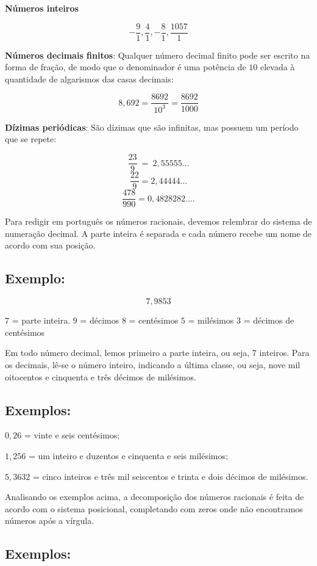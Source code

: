 \textbf{Números inteiros}

 $$-\frac{9}{1},  \frac{4}{1}, -\frac{8}{1},  \frac{1057}{1}$$

\textbf{Números decimais finitos}: Qualquer número decimal finito pode ser
escrito na forma de fração, de modo que o denominador é uma potência de
$10$ elevada à quantidade de algarismos das casas decimais:

$$8,692  = \frac{8692}{10^{3}} = \frac{8692}{1000}$$

\textbf{Dízimas periódicas}: São dízimas que são infinitas, mas possuem um
período que se repete: 

$$\frac{23}{9}\  = \ 2,55555\ldots{}$$
$$\frac{22}{9} = 2,44444\ldots{}$$
$$\frac{478}{990} = 0,4828282\ldots{}.$$

Para redigir em português os números racionais, devemos relembrar do
sistema de numeração decimal. A parte inteira é separada e cada número
recebe um nome de acordo com sua posição.

\subsection{Exemplo:} 


$$7,9853$$

$7$ = parte inteira. $9$ = décimos $8$ = centésimos $5$ = milésimos $3$ = décimos
de centésimos

Em todo número decimal, lemos primeiro a parte inteira, ou seja, 7
inteiros. Para os decimais, lê-se o número inteiro, indicando a última
classe, ou seja, nove mil oitocentos e cinquenta e três décimos de
milésimos.

\subsection{Exemplos:}

$0,26$ = vinte e seis centésimos;

$1,256$ = um inteiro e duzentos e cinquenta e seis milésimos;

$5,3632$ = cinco inteiros e três mil seiscentos e trinta e dois décimos de
milésimos.

Analisando os exemplos acima, a decomposição dos números racionais é feita de 
acordo com o sistema posicional, completando com zeros onde não encontramos 
números após a vírgula.

\subsection{Exemplos:}

